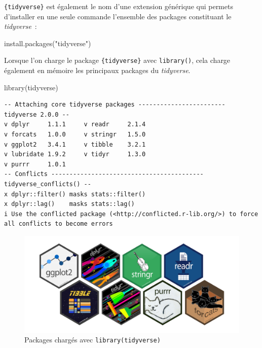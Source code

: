 \documentclass[
  letterpaper,
  DIV=11,
  numbers=noendperiod,
  oneside]{scrreprt}
\newenvironment{Shaded}{\begin{snugshade}}{\end{snugshade}}
\newcommand{\FunctionTok}[1]{\textcolor[rgb]{0.28,0.35,0.67}{#1}}
\newcommand{\NormalTok}[1]{\textcolor[rgb]{0.00,0.23,0.31}{#1}}
\newcommand{\StringTok}[1]{\textcolor[rgb]{0.13,0.47,0.30}{#1}}
\begin{document}
\texttt{\{tidyverse\}} est également le nom d'une extension générique
qui permets d'installer en une seule commande l'ensemble des packages
constituant le \emph{tidyverse}~:

\begin{Shaded}
\begin{Highlighting}[]
\FunctionTok{install.packages}\NormalTok{(}\StringTok{"tidyverse"}\NormalTok{)}
\end{Highlighting}
\end{Shaded}

Lorsque l'on charge le package \texttt{\{tidyverse\}} avec
\texttt{library()}, cela charge également en mémoire les principaux
packages du \emph{tidyverse}.

\begin{Shaded}
\begin{Highlighting}[]
\FunctionTok{library}\NormalTok{(tidyverse)}
\end{Highlighting}
\end{Shaded}

\begin{verbatim}
-- Attaching core tidyverse packages ------------------------ tidyverse 2.0.0 --
v dplyr     1.1.1     v readr     2.1.4
v forcats   1.0.0     v stringr   1.5.0
v ggplot2   3.4.1     v tibble    3.2.1
v lubridate 1.9.2     v tidyr     1.3.0
v purrr     1.0.1     
-- Conflicts ------------------------------------------ tidyverse_conflicts() --
x dplyr::filter() masks stats::filter()
x dplyr::lag()    masks stats::lag()
i Use the conflicted package (<http://conflicted.r-lib.org/>) to force all conflicts to become errors
\end{verbatim}

\begin{figure}

{\centering \includegraphics{bases/ressources/tidyverse_core_packages.png}

}

\caption{\label{fig-tidyverse-core}Packages chargés avec
\texttt{library(tidyverse)}}

\end{figure}
\end{document}
